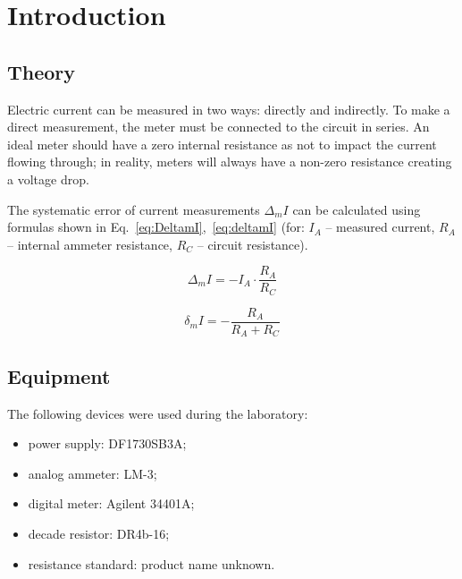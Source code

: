 \section{Introduction}

\subsection{Theory}

Electric current can be measured in two ways: directly and indirectly. To make a direct measurement, the meter must be connected to the circuit in series. An ideal meter should have a zero internal resistance as not to impact the current flowing through; in reality, meters will always have a non-zero resistance creating a voltage drop.

The systematic error of current measurements $\Delta_m I$ can be calculated using formulas shown in Eq.~\ref{eq:DeltamI},~\ref{eq:deltamI} (for: $I_A$ -- measured current, $R_A$ -- internal ammeter resistance, $R_C$ -- circuit resistance). 

\begin{equation}
	\Delta_m I = -I_A \cdot\frac{R_A}{R_C}	
	\label{eq:DeltamI}
\end{equation}

\begin{equation}
	\delta_m I = -\frac{R_A}{R_A + R_C}
	\label{eq:deltamI}
\end{equation}

\subsection{Equipment}

The following devices were used during the laboratory:

\begin{itemize}
	\item power supply: DF1730SB3A;
	\item analog ammeter: LM-3;
	\item digital meter: Agilent 34401A;
	\item decade resistor: DR4b-16;
	\item resistance standard: product name unknown.
\end{itemize}